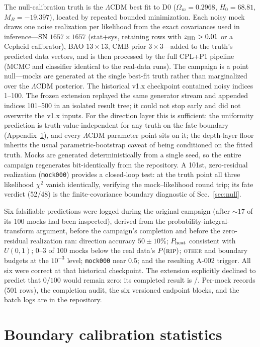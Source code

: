 \documentclass[a4paper,11pt]{article}
\newcommand{\lcdm}{\ensuremath{\Lambda\mathrm{CDM}}}
\begin{document}
The null-calibration truth is the \lcdm{} best fit to D0
($\Omega_m=0.2968$, $H_0=68.81$, $M_B=-19.397$), located by repeated
bounded minimization. Each noisy mock draws one noise realization per
likelihood from the exact covariances used in inference---SN
$1657\times1657$ (stat+sys, retaining rows with $z_{\rm HD}>0.01$ or a
Cepheid calibrator), BAO $13\times13$, CMB
prior $3\times3$---added to the truth's predicted data vectors, and is then
processed by the full CPL+P1 pipeline (MCMC and classifier identical to the
real-data runs). The campaign is a point null---mocks are generated at the
single best-fit truth rather than marginalized over the \lcdm{} posterior.
The historical v1.x checkpoint contained noisy indices 1--100. The frozen
extension replayed the same generator stream and appended indices
101--500 in an isolated result tree; it could not stop early and did not
overwrite the v1.x inputs.
For the direction layer this is sufficient: the uniformity prediction is
truth-value-independent for any truth on the fate boundary
(Appendix~\ref{app:boundarystats}), and every \lcdm{} parameter point sits
on it; the depth-layer floor inherits the usual parametric-bootstrap
caveat of being conditioned on the fitted truth.
Mocks are generated deterministically from a single seed,
so the entire campaign regenerates bit-identically from the repository. A
101st, zero-residual realization (\texttt{mock000}) provides a closed-loop
test: at the truth point all three likelihood $\chi^2$ vanish identically,
verifying the mock--likelihood round trip; its fate verdict (52/48) is the
finite-covariance boundary diagnostic of Sec.~\ref{sec:null}.

Six falsifiable predictions were logged during the original campaign (after
${\sim}17$ of its 100 mocks had been inspected), derived from the
probability-integral-transform argument, before the campaign's completion
and before the zero-residual realization ran:
direction accuracy $50\pm10\%$; $P_{\rm heat}$ consistent with $U(0,1)$;
0--3 of 100 mocks below the real data's $P(\textsc{rip})$;
\textsc{other} and boundary budgets at the $10^{-3}$ level;
\texttt{mock000} near 0.5; and the resulting A-002 trigger. All six were
correct at that historical checkpoint. The extension explicitly declined to
predict that $0/100$ would remain zero: its completed result is
\NullFiveK/\NullFiveN. Per-mock records (501 rows), the completion audit,
the six versioned endpoint blocks, and the batch logs are in the repository.

\section{Boundary calibration statistics}\label{app:boundarystats}
\end{document}
